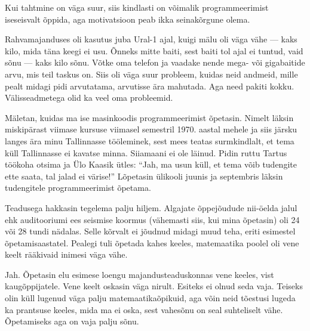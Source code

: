 
Kui tahtmine on väga suur, siis kindlasti on võimalik programmeerimist 
iseseisvalt õppida, aga motivatsioon peab ikka seinakõrgune olema. 


Rahvamajanduses oli kasutus juba Ural-1 ajal, kuigi mälu oli 
väga vähe --- kaks kilo, mida täna keegi ei usu. Õnneks mitte 
baiti, sest baiti tol ajal ei tuntud, vaid sõnu --- kaks kilo sõnu. Võtke oma 
telefon ja vaadake nende mega- või gigabaitide arvu, mis teil taskus on. 
Siis oli väga suur probleem, kuidas neid andmeid, mille pealt midagi pidi 
arvutatama, arvutisse ära mahutada. Aga need pakiti kokku. Välisseadmetega olid ka veel 
oma probleemid.  

Mäletan, kuidas ma ise masinkoodis programmeerimist õpetasin. Nimelt läksin miskipärast viimase kursuse viimasel semestril 1970. 
aastal mehele ja siis järsku langes ära minu Tallinnasse tööleminek, sest 
mees teatas surmkindlalt, et tema küll Tallinnasse ei kavatse minna. Siiamaani 
ei ole läinud. Pidin ruttu Tartus töökoha otsima ja Ülo Kaasik ütles: 
\enquote{Jah, ma usun küll, et tema võib tudengite ette saata, tal jalad ei 
värise!} Lõpetasin ülikooli juunis ja 
septembris läksin tudengitele programmeerimist õpetama. 


Teadusega hakkasin tegelema palju hiljem. Algajate õppejõudude nii-öelda jalul 
ehk auditooriumi ees seismise koormus (vähemasti siis, kui mina õpetasin) oli 24 
või 28 tundi nädalas. Selle kõrvalt ei jõudnud midagi muud teha, eriti esimestel 
õpetamisaastatel. Pealegi tuli õpetada kahes keeles,
matemaatika poolel oli vene keelt rääkivaid inimesi väga vähe. 


Jah. Õpetasin elu esimese loengu majandusteaduskonnas vene 
keeles, vist kaugõppijatele. Vene keelt 
oskasin väga nirult. Esiteks ei olnud seda vaja. Teiseks olin küll lugenud 
väga palju matemaatikaõpikuid, aga võin neid tõestusi lugeda ka 
prantsuse keeles, mida ma ei oska, sest vahesõnu on seal
suhteliselt vähe. Õpetamiseks aga on vaja palju sõnu. 

